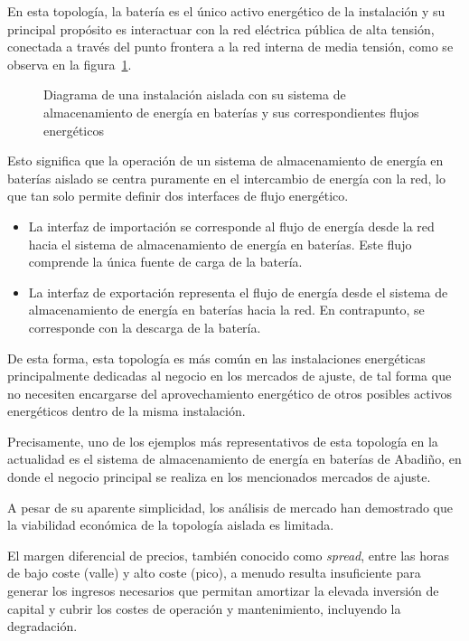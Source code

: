 En esta topología, la batería es el único activo energético de la instalación y su principal propósito es interactuar con la red eléctrica pública de alta tensión, conectada a través del punto frontera a la red interna de media tensión, como se observa en la figura~\ref{fig:topologia-aislada}.

\begin{figure}
  \centering
  \caption{Diagrama de una instalación aislada con su sistema de almacenamiento de energía en baterías y sus correspondientes flujos energéticos}
  \label{fig:topologia-aislada}
\end{figure}

Esto significa que la operación de un sistema de almacenamiento de energía en baterías aislado se centra puramente en el intercambio de energía con la red, lo que tan solo permite definir dos interfaces de flujo energético.

\begin{itemize}

  \item La interfaz de importación se corresponde al flujo de energía desde la red hacia el sistema de almacenamiento de energía en baterías. Este flujo comprende la única fuente de carga de la batería.

  \item  La interfaz de exportación representa el flujo de energía desde el sistema de almacenamiento de energía en baterías hacia la red. En contrapunto, se corresponde con la descarga de la batería.

\end{itemize}

De esta forma, esta topología es más común en las instalaciones energéticas principalmente dedicadas al negocio en los mercados de ajuste, de tal forma que no necesiten encargarse del aprovechamiento energético de otros posibles activos energéticos dentro de la misma instalación.

Precisamente, uno de los ejemplos más representativos de esta topología en la actualidad es el sistema de almacenamiento de energía en baterías de Abadiño, en donde el negocio principal se realiza en los mencionados mercados de ajuste.

A pesar de su aparente simplicidad, los análisis de mercado han demostrado que la viabilidad económica de la topología aislada es limitada.

El margen diferencial de precios, también conocido como \textit{spread}, entre las horas de bajo coste (valle) y alto coste (pico), a menudo resulta insuficiente para generar los ingresos necesarios que permitan amortizar la elevada inversión de capital y cubrir los costes de operación y mantenimiento, incluyendo la degradación.

